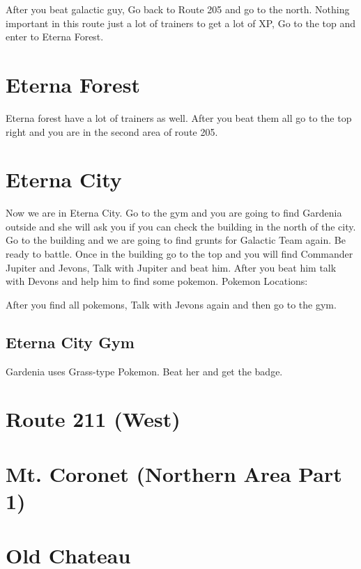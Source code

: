 \documentclass[11pt]{article}
\begin{document}
After you beat galactic guy, Go back to Route 205 and go to the north.
Nothing important in this route just a lot of trainers to get a lot of XP,
Go to the top and enter to Eterna Forest.



\section{Eterna Forest}\label{sec:Eterna_Forest}

Eterna forest have a lot of trainers as well.
After you beat them all go to the top right and you are in the second area of route 205.



\section{Eterna City}\label{sec:eterna-city}
Now we are in Eterna City.
Go to the gym and you are going to find Gardenia outside and she will ask you
if you can check the building in the north of the city.
Go to the building and we are going to find grunts for Galactic Team again.
Be ready to battle.
Once in the building go to the top and you will find
Commander Jupiter and Jevons, Talk with Jupiter and beat him.
After you beat him talk with Devons and help him to find some pokemon.
Pokemon Locations:

After you find all pokemons, Talk with Jevons again and then go to the gym.

\subsection{Eterna City Gym}\label{subsec:eterna-city-gym}
Gardenia uses Grass-type Pokemon.
Beat her and get the badge.

\section{Route 211 (West)}\label{sec:Route_211_(West)}



\section{Mt. Coronet (Northern Area Part 1)}
\label{sec:Mt._Coronet}


\section{Old Chateau}
\label{sec:Old_Chateau}

\end{document}
